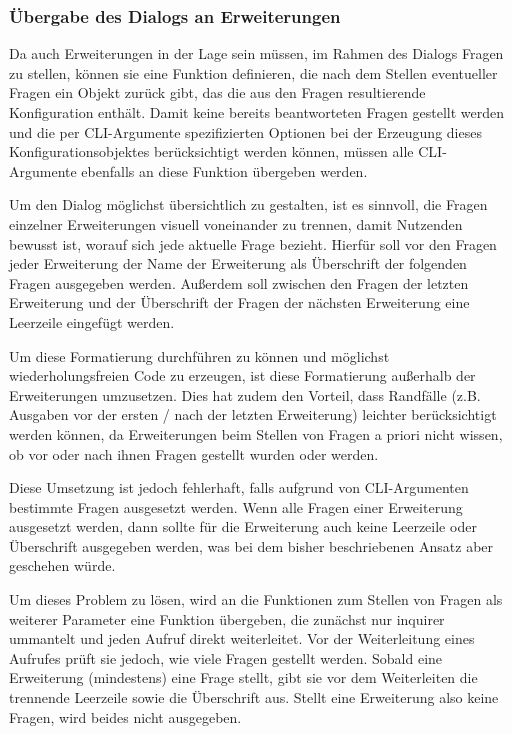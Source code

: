 \subsubsection{Übergabe des Dialogs an Erweiterungen}
\label{impl:extension_questions}

Da auch Erweiterungen in der Lage sein müssen, im Rahmen des Dialogs Fragen zu stellen, können sie eine Funktion definieren, die nach dem Stellen eventueller Fragen ein Objekt zurück gibt, das die aus den Fragen resultierende Konfiguration enthält. Damit keine bereits beantworteten Fragen gestellt werden und die per \gls{CLI}-Argumente spezifizierten Optionen bei der Erzeugung dieses Konfigurationsobjektes berücksichtigt werden können, müssen alle \gls{CLI}-Argumente ebenfalls an diese Funktion übergeben werden.

Um den Dialog möglichst übersichtlich zu gestalten, ist es sinnvoll, die Fragen einzelner Erweiterungen visuell voneinander zu trennen, damit Nutzenden bewusst ist, worauf sich jede aktuelle Frage bezieht. Hierfür soll vor den Fragen jeder Erweiterung der Name der Erweiterung als Überschrift der folgenden Fragen ausgegeben werden. Außerdem soll zwischen den Fragen der letzten Erweiterung und der Überschrift der Fragen der nächsten Erweiterung eine Leerzeile eingefügt werden.

Um diese Formatierung durchführen zu können und möglichst wiederholungsfreien Code zu erzeugen, ist diese Formatierung außerhalb der Erweiterungen umzusetzen. Dies hat zudem den Vorteil, dass Randfälle (z.B. Ausgaben vor der ersten / nach der letzten Erweiterung) leichter berücksichtigt werden können, da Erweiterungen beim Stellen von Fragen a priori nicht wissen, ob vor oder nach ihnen Fragen gestellt wurden oder werden.

Diese Umsetzung ist jedoch fehlerhaft, falls aufgrund von \gls{CLI}-Argumenten bestimmte Fragen ausgesetzt werden. Wenn alle Fragen einer Erweiterung ausgesetzt werden, dann sollte für die Erweiterung auch keine Leerzeile oder Überschrift ausgegeben werden, was bei dem bisher beschriebenen Ansatz aber geschehen würde.

Um dieses Problem zu lösen, wird an die Funktionen zum Stellen von Fragen als weiterer Parameter eine Funktion übergeben, die zunächst nur inquirer ummantelt und jeden Aufruf direkt weiterleitet. Vor der Weiterleitung eines Aufrufes prüft sie jedoch, wie viele Fragen gestellt werden. Sobald eine Erweiterung (mindestens) eine Frage stellt, gibt sie vor dem Weiterleiten die trennende Leerzeile sowie die Überschrift aus. Stellt eine Erweiterung also keine Fragen, wird beides nicht ausgegeben.

